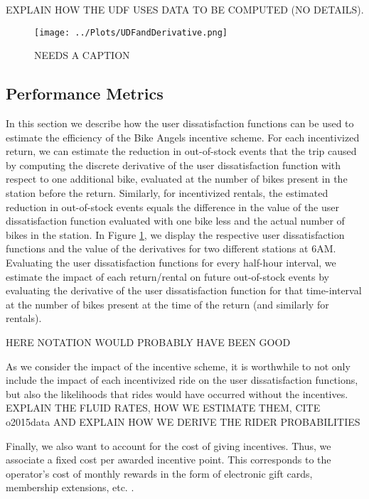 EXPLAIN HOW THE UDF USES DATA TO BE COMPUTED (NO DETAILS).


\begin{figure}
\centering
\texttt{[image: ../Plots/UDFandDerivative.png]}
\caption{NEEDS A CAPTION}
\label{fig:UDFandDerivative}
\end{figure}


\subsection{Performance Metrics}

In this section we describe how the user dissatisfaction functions can be used to estimate the efficiency of the Bike Angels incentive scheme. For each incentivized return, we can estimate the reduction in out-of-stock events that the trip caused by computing the discrete derivative of the user dissatisfaction function with respect to one additional bike, evaluated at the number of bikes present in the station before the return. Similarly, for incentivized rentals, the estimated reduction in out-of-stock events equals the difference in the value of the user dissatisfaction function evaluated with one bike less and the actual number of bikes in the station. In Figure \ref{fig:UDFandDerivative}, we display the respective user dissatisfaction functions and the value of the derivatives for two different stations at 6AM. Evaluating the user dissatisfaction functions for every half-hour interval, we estimate the impact of each return/rental on future out-of-stock events by evaluating the derivative of the user dissatisfaction function for that time-interval at the number of bikes present at the time of the return (and similarly for rentals). 

HERE NOTATION WOULD PROBABLY HAVE BEEN GOOD

As we consider the impact of the incentive scheme, it is worthwhile to not only include the impact of each incentivized ride on the user dissatisfaction functions, but also the likelihoods that rides would have occurred without the incentives. EXPLAIN THE FLUID RATES, HOW WE ESTIMATE THEM, CITE o2015data AND EXPLAIN HOW WE DERIVE THE RIDER PROBABILITIES

Finally, we also want to account for the cost of giving incentives. Thus, we associate a fixed cost per awarded incentive point. This corresponds to the operator's cost of monthly rewards in the form of electronic gift cards, membership extensions, etc. \cite{bikeangels}.




